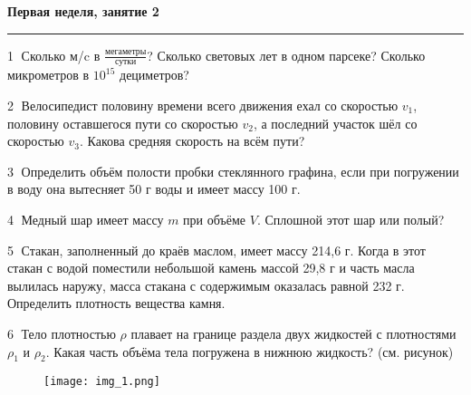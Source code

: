 \documentclass[12pt,a4paper]{article}
\begin{document}
\textbf{Первая неделя, занятие 2}
\vskip 5pt
\hrule
\vskip 15pt

\textcircled{1} Сколько м/c в $\frac{\text{мегаметры}}{\text{сутки}}$? Сколько световых лет в одном парсеке? Сколько микрометров в $10^{15}$ дециметров?

\textcircled{2} Велосипедист половину времени всего движения ехал со скоростью $v_1$, половину оставшегося пути со скоростью $v_2$, а последний участок шёл со скоростью $v_3$. Какова средняя скорость на всём пути?

\textcircled{3} Определить объём полости пробки стеклянного графина, если при погружении в воду она вытесняет 50 г воды и имеет массу 100 г. 

\textcircled{4} Медный шар имеет массу $m$ при объёме $V$. Сплошной этот шар или полый?

\textcircled{5} Стакан, заполненный до краёв маслом, имеет массу 214,6 г. Когда в этот стакан с водой поместили небольшой камень массой 29,8 г и часть масла вылилась наружу, масса стакана с содержимым оказалась равной 232 г. Определить плотность вещества камня.

\textcircled{6} Тело плотностью $\rho$ плавает на границе раздела двух жидкостей с плотностями $\rho_1$ и $\rho_2$. Какая часть объёма тела погружена в нижнюю жидкость? (см. рисунок)

\begin{figure}[h!]
	\texttt{[image: img\_1.png]}
\end{figure}
\end{document}
